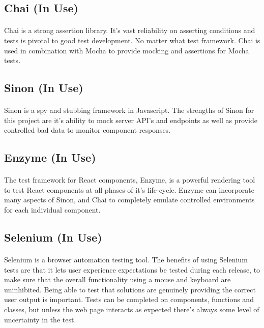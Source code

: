 \documentclass[12pt]{article}
\begin{document}
\subsection{Chai (In Use)}
\paragraph{}	Chai is a strong assertion library. It's vast reliability on asserting conditions and tests is pivotal to good test development. No matter what test framework. Chai is used in combination with Mocha to provide mocking and assertions for Mocha tests.
\subsection{Sinon (In Use)}
\paragraph{}	Sinon is a spy and stubbing framework in Javascript. The strengths of Sinon for this project are it's ability to mock server API's and endpoints as well as provide controlled bad data to monitor component responses.
\subsection{Enzyme (In Use)}
\paragraph{}	The test framework for React components, Enzyme, is a powerful rendering tool to test React components at all phases of it's life-cycle. Enzyme can incorporate many aspects of Sinon, and Chai to completely emulate controlled environments for each individual component.
\subsection{Selenium (In Use)}
\paragraph{}	Selenium is a browser automation testing tool. The benefits of using Selenium tests are that it lets user experience expectations be tested during each release, to make sure that the overall functionality using a mouse and keyboard are uninhibited. Being able to test that solutions are genuinely providing the correct user output is important. Tests can be completed on components, functions and classes, but unless the web page interacts as expected there's always some level of uncertainty in the test. 
\end{document}
